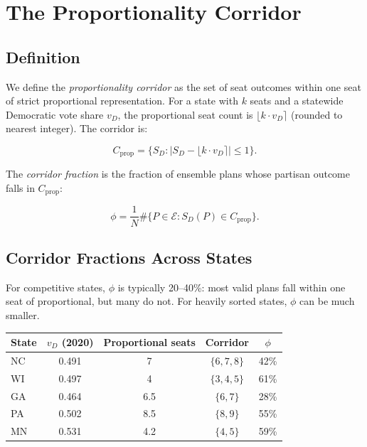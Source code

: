 \section{The Proportionality Corridor}
\label{sec:corridor}

\subsection{Definition}

We define the \emph{proportionality corridor} as the set of seat outcomes
within one seat of strict proportional representation.  For a state with
$k$ seats and a statewide Democratic vote share $v_D$, the proportional
seat count is $\lfloor k \cdot v_D \rceil$ (rounded to nearest integer).
The corridor is:

\begin{equation}
  C_{\text{prop}} = \{S_D : |S_D - \lfloor k \cdot v_D \rceil| \leq 1\}.
  \label{eq:corridor}
\end{equation}

The \emph{corridor fraction} is the fraction of ensemble plans whose partisan
outcome falls in $C_{\text{prop}}$:

\begin{equation}
  \phi = \frac{1}{N} \#\{P \in \mathcal{E} : S_D(P) \in C_{\text{prop}}\}.
  \label{eq:corridor-fraction}
\end{equation}

\subsection{Corridor Fractions Across States}

For competitive states, $\phi$ is typically 20--40\%: most valid plans fall
within one seat of proportional, but many do not.  For heavily sorted states,
$\phi$ can be much smaller.

\begin{center}
\begin{tabular}{lcccc}
\toprule
State & $v_D$ (2020) & Proportional seats & Corridor & $\phi$ \\
\midrule
NC & 0.491 & 7     & $\{6, 7, 8\}$ & 42\% \\
WI & 0.497 & 4     & $\{3, 4, 5\}$ & 61\% \\
GA & 0.464 & 6.5   & $\{6, 7\}$   & 28\% \\
PA & 0.502 & 8.5   & $\{8, 9\}$   & 55\% \\
MN & 0.531 & 4.2   & $\{4, 5\}$   & 59\% \\
\bottomrule
\end{tabular}
\end{center}

